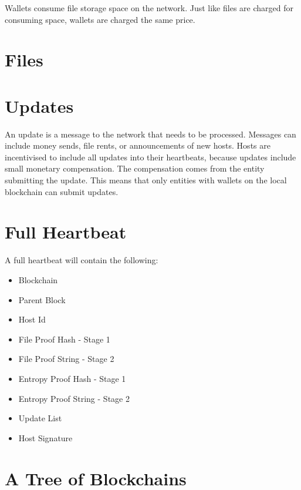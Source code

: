 \documentclass[twocolumn]{article}
\begin{document}
Wallets consume file storage space on the network.
Just like files are charged for consuming space, wallets are charged the same price.


\section{Files}

\section{Updates}

An update is a message to the network that needs to be processed.
Messages can include money sends, file rents, or announcements of new hosts.
Hosts are incentivised to include all updates into their heartbeats, because updates include small monetary compensation.
The compensation comes from the entity submitting the update.
This means that only entities with wallets on the local blockchain can submit updates.


\section{Full Heartbeat}

A full heartbeat will contain the following:

\begin{itemize}
	\item Blockchain
	\item Parent Block
	\item Host Id
	\item File Proof Hash - Stage 1
	\item File Proof String - Stage 2
	\item Entropy Proof Hash - Stage 1
	\item Entropy Proof String - Stage 2
	\item Update List
	\item Host Signature
\end{itemize}

\section{A Tree of Blockchains}
\end{document}
